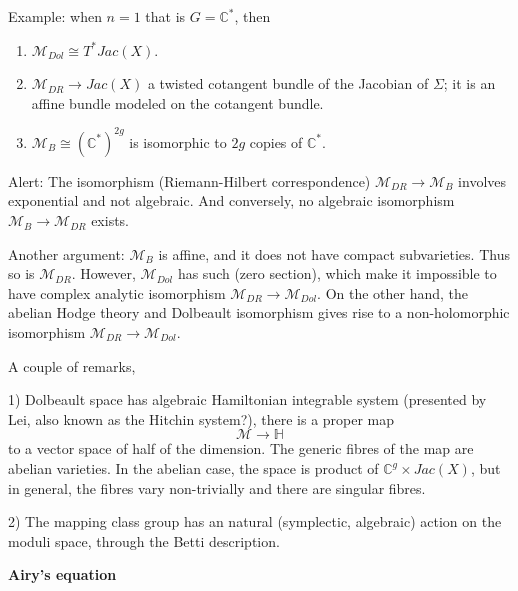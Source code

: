 Example: when $n=1$ that is $G = \mathbb{C}^*$, then
\begin{enumerate}
  \item $\mathcal{M}_{Dol} \cong T^*Jac(X)$.
  \item $\mathcal{M}_{DR} \rightarrow Jac(X)$ a twisted cotangent bundle of the Jacobian of $\Sigma$; it is an affine bundle modeled on the cotangent bundle.
  \item $\mathcal{M}_{B} \cong (\mathbb{C}^*)^{2g}$ is isomorphic to $2g$ copies of $\mathbb{C}^*$.
\end{enumerate}

Alert: The isomorphism (Riemann-Hilbert correspondence) $\mathcal{M}_{DR} \rightarrow \mathcal{M}_{B}$ involves exponential and not algebraic. And conversely, no algebraic isomorphism $\mathcal{M}_{B}\rightarrow \mathcal{M}_{DR}$ exists.

Another argument: $\mathcal{M}_{B}$ is affine, and it does not have compact subvarieties. Thus so is $\mathcal{M}_{DR}$. However, $\mathcal{M}_{Dol}$ has such (zero section), which make it impossible to have complex analytic isomorphism $\mathcal{M}_{DR} \rightarrow \mathcal{M}_{Dol}$. On the other hand, the abelian Hodge theory and Dolbeault isomorphism gives rise to a non-holomorphic isomorphism $\mathcal{M}_{DR} \rightarrow \mathcal{M}_{Dol}$.

A couple of remarks,

1) Dolbeault space has algebraic Hamiltonian integrable system (presented by Lei, also known as the Hitchin system?), there is a proper map
$$\mathcal{M}\rightarrow \mathbb{H}$$
to a vector space of half of the dimension. The generic fibres of the map are abelian varieties. In the abelian case, the space is product of $\mathbb{C}^g\times Jac(X)$, but in general, the fibres vary non-trivially and there are singular fibres.

2) The mapping class group has an natural (symplectic, algebraic) action on the moduli space, through the Betti description.


\medskip
\textbf{Airy's equation}

